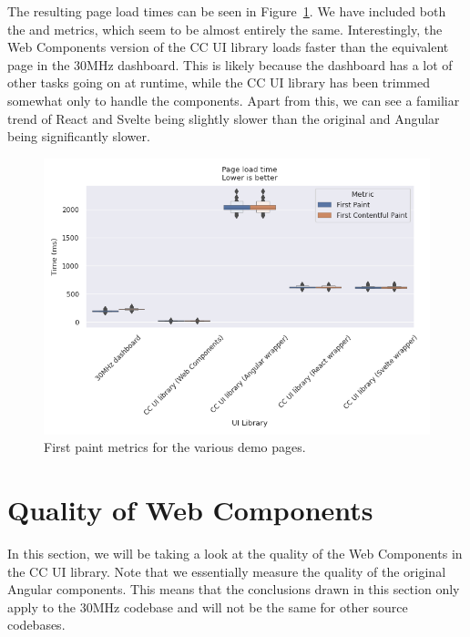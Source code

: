 The resulting page load times can be seen in Figure~\ref{fig:results:first-paint}. We have included both the  and  metrics, which seem to be almost entirely the same. Interestingly, the Web Components version of the CC UI library loads faster than the equivalent page in the 30MHz dashboard. This is likely because the dashboard has a lot of other tasks going on at runtime, while the CC UI library has been trimmed somewhat only to handle the components. Apart from this, we can see a familiar trend of React and Svelte being slightly slower than the original and Angular being significantly slower.

\begin{figure}[h]
  \includegraphics[width=\columnwidth]{plots/first-contentful-paint.png}
  \caption{First paint metrics for the various demo pages.}
  \label{fig:results:first-paint}
  \centering
\end{figure}

\section{Quality of Web Components}
In this section, we will be taking a look at the quality of the Web Components in the CC UI library. Note that we essentially measure the quality of the original Angular components. This means that the conclusions drawn in this section only apply to the 30MHz codebase and will not be the same for other source codebases.


